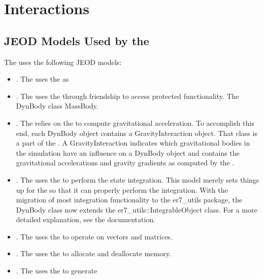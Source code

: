 \section{Interactions}

\subsection{JEOD Models Used by the \ModelDesc}
The \ModelDesc uses the following JEOD models:
\begin{itemize}
\item{}. The \ModelDesc uses the \DYNMANAGER as
\item{}. The \ModelDesc uses the \MASS through friendship to 
    access protected functionality. The DynBody class \hasa MassBody.
\item{}. The \ModelDesc relies on the \GRAVITY to
  compute gravitational acceleration. To accomplish this end, each DynBody
  object contains a GravityInteraction object. That class is a part of the
  \GRAVITY. A GravityInteraction indicates which gravitational bodies in the
  simulation have an influence on a DynBody object and contains the
  gravitational accelerations and gravity gradients as computed by the
  \GRAVITY.
\item{}. The \ModelDesc uses the \INTEGRATION to
  perform the state integration. This model merely sets things up for the
  \INTEGRATION so that it can properly perform the integration.
With the migration of most integration functionality to the er7\_utils
package, the DynBody class now extends the er7\_utils::IntegrableObject class.
For a more detailed explanation, see the \INTEGRATION documentation.
\item{}. The \ModelDesc uses the \MATH to operate on
  vectors and matrices.
\item{}. The \ModelDesc uses the \MEMORY to allocate
  and deallocate memory.
\item{}. The \ModelDesc uses the \MESSAGE to generate

\end{itemize}
